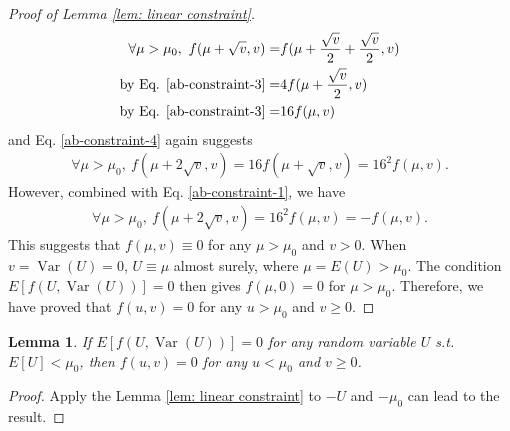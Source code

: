 \documentclass[11pt]{article}
\theoremstyle{referenceplain}
\newtheorem{lemma}{Lemma}[section]
\theoremstyle{referencedefinition}
\theoremstyle{referenceremark}
\begin{document}
\begin{proof}[Proof of Lemma \ref{lem: linear constraint}]
\begin{align}
        \forall\mu>\mu_0,~f(\mu+\sqrt{v},v) =& f(\mu+\frac{\sqrt{v}}{2}+\frac{\sqrt{v}}{2},v)\notag\\
        \text{by Eq. \eqref{ab-constraint-3}}=&4f(\mu+\frac{\sqrt{v}}{2},v)\notag\\
        \text{by Eq. \eqref{ab-constraint-3}}=&16f(\mu,v)
    \end{align}
    and Eq. \eqref{ab-constraint-4} again suggests
    \begin{align}
         \forall\mu>\mu_0,~f(\mu+2\sqrt{v},v) = 16 f(\mu+\sqrt{v},v) = 16^2 f(\mu,v).
    \end{align}
    However, combined with Eq. \eqref{ab-constraint-1}, we have
    \begin{align*}
        \forall\mu>\mu_0,~f(\mu+2\sqrt{v},v) = 16^2 f(\mu,v) = -f(\mu,v).
    \end{align*}
    This suggests that $f(\mu,v)\equiv 0$ for any $\mu>\mu_0$ and $v>0$. When $v=\operatorname{Var}(U)=0$, $U\equiv \mu$ almost surely, where $\mu = E(U)>\mu_0$. The condition $E[f(U,\operatorname{Var}(U))] = 0$ then gives $f(\mu,0) = 0$ for $\mu>\mu_0$. Therefore, we have proved that $f(u,v)=0$ for any $u>\mu_0$ and $v\ge 0$.
\end{proof}
\begin{lemma}\label{lem: linear constraint neg}
    If $E[f(U,\operatorname{Var} (U))] = 0$ for any random variable $U$ s.t. $E[U]< \mu_0$, then $f(u,v) = 0$ for any $u<\mu_0$ and $v\ge 0$.
\end{lemma}
\begin{proof}
    Apply the Lemma \ref{lem: linear constraint} to $-U$ and $-\mu_0$ can lead to the result.
\end{proof}
\end{document}
